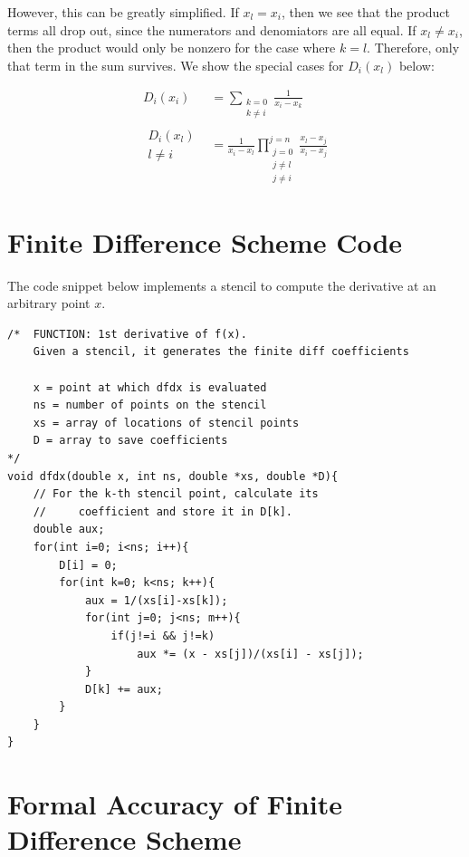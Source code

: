 \documentclass{article}
\begin{document}
However, this can be greatly simplified.
If $x_l = x_i$, then we see that the product terms all drop out,
	since the numerators and denomiators are all equal.
If $x_l \neq x_i$, then the product would only be nonzero for the
	case where $k=l$.
Therefore, only that term in the sum survives.
We show the special cases for $D_i(x_l)$ below:

\begin{align}
D_i(x_i) & = \sum_{\begin{matrix}k=0\\k\neq i\end{matrix}} \frac{1}{x_i - x_k}\\
\begin{matrix}D_i(x_l)\\l \neq i\end{matrix} & = \frac{1}{x_i - x_l} 
	\prod_{
		\begin{matrix} j = 0 \\ j \neq l\\j \neq i \end{matrix}}^{j=n}
		\frac{x_l - x_j}{x_i - x_j} 
\end{align}

\section{Finite Difference Scheme Code}

The code snippet below implements a stencil to compute the derivative
	at an arbitrary point $x$.

\lstset{language=C++}
\begin{lstlisting}
/*  FUNCTION: 1st derivative of f(x).
    Given a stencil, it generates the finite diff coefficients

    x = point at which dfdx is evaluated
    ns = number of points on the stencil
    xs = array of locations of stencil points
    D = array to save coefficients
*/
void dfdx(double x, int ns, double *xs, double *D){
    // For the k-th stencil point, calculate its 
    //     coefficient and store it in D[k].
    double aux;
    for(int i=0; i<ns; i++){
        D[i] = 0;
        for(int k=0; k<ns; k++){
            aux = 1/(xs[i]-xs[k]);
            for(int j=0; j<ns; m++){
                if(j!=i && j!=k)
                    aux *= (x - xs[j])/(xs[i] - xs[j]);
            }
            D[k] += aux;
        }
    }
}
\end{lstlisting}

\section{Formal Accuracy of Finite Difference Scheme}
\end{document}
